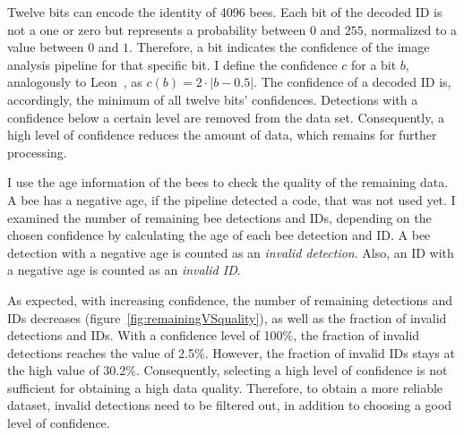 
Twelve bits can encode the identity of 4096 bees.
Each bit of the decoded ID is not a one or zero but represents a probability between $0$ and $255$, normalized to a value between $0$ and $1$.
Therefore, a bit indicates the confidence of the image analysis pipeline for that specific bit.
I define the confidence $c$ for a bit $b$, analogously to Leon~\textcite[p.~14]{leon2016}, as $c(b)=2\cdot|b-0.5|$.
The confidence of a decoded ID is, accordingly, the minimum of all twelve bits' confidences.
Detections with a confidence below a certain level are removed from the data set.
Consequently, a high level of confidence reduces the amount of data, which remains for further processing.

I use the age information of the bees to check the quality of the remaining data.
A bee has a negative age, if the pipeline detected a code, that was not used yet.
I examined the number of remaining bee detections and IDs, depending on the chosen confidence by calculating the age of each bee detection and ID.
A bee detection with a negative age is counted as an \emph{invalid detection}. Also, an ID with a negative age is counted as an \emph{invalid ID}.

As expected, with increasing confidence, the number of remaining detections and IDs decreases (figure~\ref{fig:remainingVSquality}), as well as the fraction of invalid detections and IDs.
With a confidence level of 100\%, the fraction of invalid detections reaches the value of 2.5\%. However, the fraction of invalid IDs stays at the high value of 30.2\%. Consequently, selecting a high level of confidence is not sufficient for obtaining a high data quality.
Therefore, to obtain a more reliable dataset, invalid detections need to be filtered out, in addition to choosing a good level of confidence.

